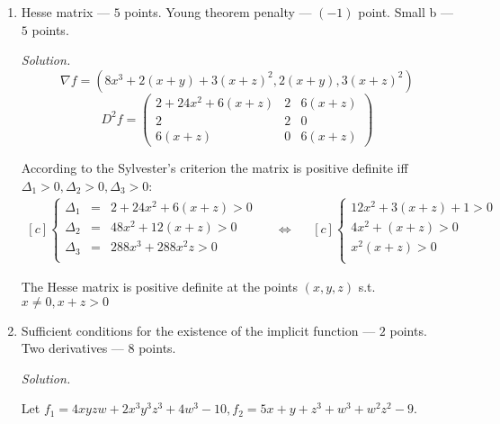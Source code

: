 \begin{enumerate}
\item Hesse matrix --- $5$ points. Young theorem penalty --- $(-1)$ point. Small b --- $5$ points.

\textit{Solution.}
\begin{equation*}
\nabla f = \left(8 x^3+2 (x+y)+3 (x+z)^2,2 (x+y),3 (x+z)^2\right)
\end{equation*}
\begin{equation*}
D^2f =\left(
\begin{array}{ccc}
 2+24 x^2+6 (x+z) & 2 & 6 (x+z) \\
 2 & 2 & 0 \\
 6 (x+z) & 0 & 6 (x+z)
\end{array}
\right)
\end{equation*}

According to the Sylvester's criterion the matrix is positive definite iff $\Delta_1>0, \Delta_2>0, \Delta_3>0$:
\begin{equation*}
\begin{aligned}[c]
\left\{
\begin{array}{ccl}
\Delta_1 &=& 2+24 x^2+6 (x+z) >0\\
\Delta_2 &=& 48 x^2+12(x+z)>0\\
\Delta_3 &=&288 x^3+288 x^2 z>0\\
\end{array}
\right.
\end{aligned}
\quad\Longleftrightarrow\quad
\begin{aligned}[c]
\left\{
\begin{array}{l}
 12x^2+3 (x+z) +1>0\\
4x^2+(x+z)>0\\
x^2(x+z)>0\\
\end{array}
\right.
\end{aligned}
\end{equation*}

The Hesse matrix is positive definite at the points $(x,y,z)$ s.t. $x\neq0, x+z>0$


\item Sufficient conditions for the existence of the implicit function --- $2$ points. Two derivatives --- $8$ points.

\textit{Solution.}

Let $f_1 = 4x y z w+2x^3 y^3 z^3+4w^3-10, f_2=5 x+y+z^3+w^3+w^2 z^2-9$.


\end{enumerate}
